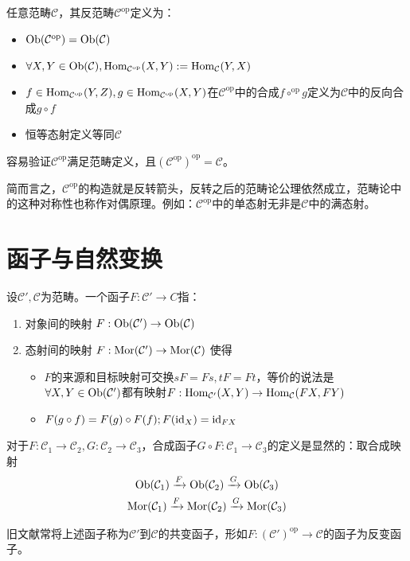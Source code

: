 \begin{Def}[反范畴]任意范畴$\mathcal{C}$，其反范畴$\mathcal{C}^{\text{op}}$定义为：
    \begin{itemize}
        \item $\operatorname{Ob}(\mathcal{C}^{\text{op}})=\operatorname{Ob}(\mathcal{C})$
        \item $\forall X,Y \in \operatorname{Ob}(\mathcal{C}), \operatorname{Hom}_{\mathcal{C}^{\text{op}}}(X,Y):=\operatorname{Hom}_{\mathcal{C}}(Y,X)$
        \item $f \in \operatorname{Hom}_{\mathcal{C}^{\text{op}}}(Y,Z), g\in \operatorname{Hom}_{\mathcal{C}^{\text{op}}}(X,Y)$在$\mathcal{C}^{\text{op}}$中的合成$f \circ^{\text{op}}g$定义为$\mathcal{C}$中的反向合成$g\circ f$
        \item 恒等态射定义等同$\mathcal{C}$
    \end{itemize}
    容易验证$\mathcal{C}^{\text{op}}$满足范畴定义，且$(\mathcal{C}^{\text{op}})^{\text{op}}=\mathcal{C}$。
\end{Def}
    简而言之，$\mathcal{C}^{\text{op}}$的构造就是反转箭头，反转之后的范畴论公理依然成立，范畴论中的这种对称性也称作对偶原理。例如：$\mathcal{C}^{\text{op}}$中的单态射无非是$\mathcal{C}$中的满态射。

\section{函子与自然变换}

\begin{Def}[函子]设$\mathcal{C}',\mathcal{C}$为范畴。一个函子$F:\mathcal{C}'\rightarrow C$指：
    \begin{enumerate}
        \item 对象间的映射 $F:\operatorname{Ob}(\mathcal{C}')\rightarrow \operatorname{Ob}(\mathcal{C})$
        \item 态射间的映射 $F:\operatorname{Mor}(\mathcal{C}')\rightarrow \operatorname{Mor}(\mathcal{C})$ 使得
        \begin{itemize}
            \item $F$的来源和目标映射可交换$sF=Fs, tF=Ft$，等价的说法是$\forall X,Y\in \operatorname{Ob}(\mathcal{C}')$都有映射$F:\operatorname{Hom}_{\mathcal{C}'}(X,Y)\rightarrow \operatorname{Hom}_{\mathcal{C}}(FX,FY)$
            \item $F(g\circ f)=F(g)\circ F(f); F(\mathrm{id}_X)=\mathrm{id}_{FX}$
        \end{itemize}
    \end{enumerate}
    对于$F:\mathcal{C}_1\rightarrow \mathcal{C}_2, G:\mathcal{C}_2\rightarrow \mathcal{C}_3$，合成函子$G\circ F:\mathcal{C}_1\rightarrow \mathcal{C}_3$的定义是显然的：取合成映射
    \begin{gather*}
        \operatorname{Ob}(\mathcal{C}_1)\xrightarrow{F} \operatorname{Ob}(\mathcal{C}_2)\xrightarrow{G} \operatorname{Ob}(\mathcal{C}_3)       \\
        \operatorname{Mor}(\mathcal{C}_1)\xrightarrow{F} \operatorname{Mor}(\mathcal{C}_2)\xrightarrow{G}\operatorname{Mor}(\mathcal{C}_3)    \\
    \end{gather*}
\end{Def}
旧文献常将上述函子称为$\mathcal{C}'$到$\mathcal{C}$的共变函子，形如$F:(\mathcal{C}')^{\text{op}}\rightarrow \mathcal{C}$的函子为反变函子。


